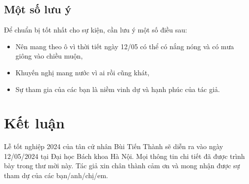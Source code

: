 \documentclass[final,5p,times,twocolumn, 8pt, a4paper]{elsarticle}
\begin{document}
        \subsection{Một số lưu ý}
            \par Để chuẩn bị tốt nhất cho sự kiện, cần lưu ý một số điều sau:
            \begin{itemize}
                \item Nên mang theo ô vì thời tiết ngày 12/05 có thể có nắng nóng và có mưa giông vào chiều muộn,
                \item Khuyến nghị mang nước vì ai rồi cũng khát,
                \item Sự tham gia của các bạn là niềm vinh dự và hạnh phúc của tác giả.
            \end{itemize}
    \section{Kết luận}
        \par Lễ tốt nghiệp 2024 của tân cử nhân Bùi Tiến Thành sẽ diễn ra vào ngày 12/05/2024 tại Đại học Bách khoa Hà Nội. Mọi thông tin chi tiết đã được trình bày trong thư mời này. Tác giả xin chân thành cảm ơn và mong nhận được sự tham dự của các bạn/anh/chị/em.
\end{document}
